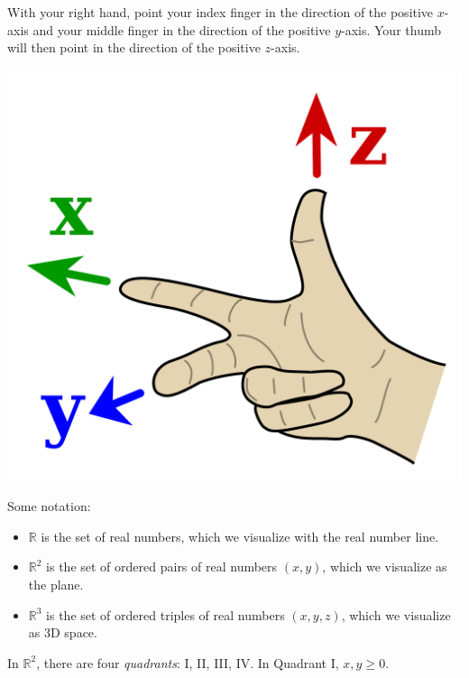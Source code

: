\begin{minipage}{.6\textwidth}
\begin{framed}
With your right hand, point your index finger in the direction of the positive $x$-axis and your middle finger in the direction of the positive $y$-axis. Your thumb will then point in the direction of the positive $z$-axis.
\end{framed}
\end{minipage}
\hfill \begin{minipage}{.3\textwidth}
\includegraphics[width=\textwidth]{images/right hand rule axes.png}\label{img:right-hand-axes}
\end{minipage}

Some notation:
\begin{itemize}
    \item $\mathbb{R}$ is the set of real numbers, which we visualize with the real number line.
    \item $\mathbb{R}^2$ is the set of ordered pairs of real numbers $(x,y)$, which we visualize as the plane.
    \item $\mathbb{R}^3$ is the set of ordered triples of real numbers $(x,y,z)$, which we visualize as 3D space.
\end{itemize}

\vfill

In $\mathbb{R}^2$, there are four \emph{quadrants}: I, II, III, IV. In Quadrant I, $x,y\ge0$.
\medskip 

